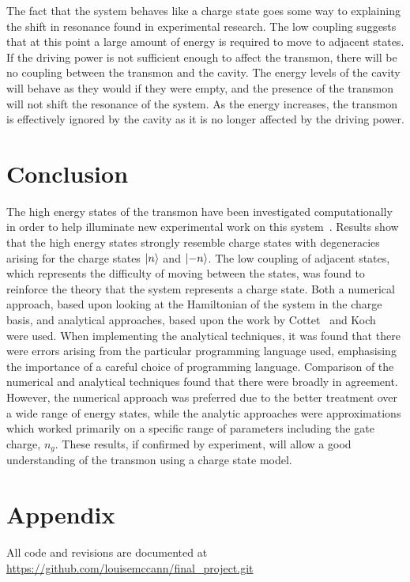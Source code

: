 \documentclass[11pt]{article}
\begin{document}
The fact that the system behaves like a charge state goes some way to explaining the shift in resonance found in experimental research. The low coupling suggests that at this point a large amount of energy is required to move to adjacent states. If the driving power is not sufficient enough to affect the transmon, there will be no coupling between the transmon and the cavity. The energy levels of the cavity will behave as they would if they were empty, and the presence of the transmon will not shift the resonance of the system. As the energy increases, the transmon is effectively ignored by the cavity as it is no longer affected by the driving power.


\section{Conclusion}
The high energy states of the transmon have been investigated computationally in order to help illuminate new experimental work on this system~\cite{lescanneDynamicsOffresonantlyPumped2018}. Results show that the high energy states strongly resemble charge states with degeneracies arising for the charge states $\ket{n}$ and $\ket{-n}$. The low coupling of adjacent states, which represents the difficulty of moving between the states, was found to reinforce the theory that the system represents a charge state. Both a numerical approach, based upon looking at the Hamiltonian of the system in the charge basis, and analytical approaches, based upon the work by Cottet~\cite{cottetImplementationQuantumBit2002} and Koch~\cite{kochChargeinsensitiveQubitDesign2007} were used. When implementing the analytical techniques, it was found that there were errors arising from the particular programming language used, emphasising the importance of a careful choice of programming language. Comparison of the numerical and analytical techniques found that there were broadly in agreement. However, the numerical approach was preferred due to the better treatment over a wide range of energy states, while the analytic approaches were approximations which worked primarily on a specific range of parameters including the gate charge, $n_g$. These results, if confirmed by experiment, will allow a good understanding of the transmon using a charge state model.
\section{Appendix}

All code and revisions are documented at \url{https://github.com/louisemccann/final_project.git}

\clearpage


\appendix
\end{document}
